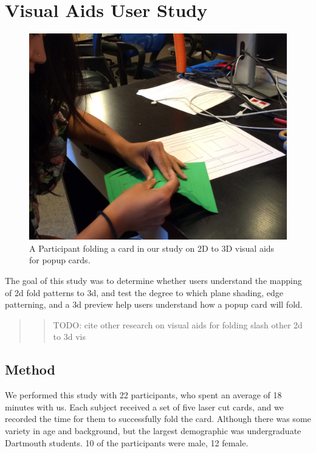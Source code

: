 \section{Visual Aids User Study}\label{visual-aids-user-study}

\begin{figure}[htbp]
\centering
\includegraphics{figures/51_User_Study_Visual_Aids/kikofoldling.jpg}
\caption{A Participant folding a card in our study on 2D to 3D visual
aids for popup cards.}
\end{figure}

The goal of this study was to determine whether users understand the
mapping of 2d fold patterns to 3d, and test the degree to which plane
shading, edge patterning, and a 3d preview help users understand how a
popup card will fold.

\begin{quote}
\begin{quote}
TODO: cite other research on visual aids for folding slash other 2d to
3d vis
\end{quote}
\end{quote}

\subsection{Method}\label{method}

We performed this study with 22 participants, who spent an average of 18
minutes with us. Each subject received a set of five laser cut cards,
and we recorded the time for them to successfully fold the card.
Although there was some variety in age and background, but the largest
demographic was undergraduate Dartmouth students. 10 of the participants
were male, 12 female.

